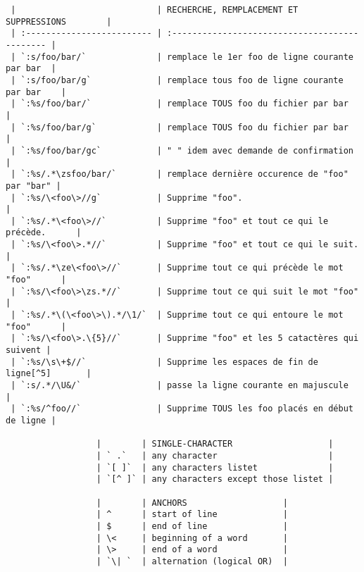 \documentclass[10pt,landscape]{article}
\begin{document}
\begin{multicols}{2}
\begin{verbatim}
 |                            | RECHERCHE, REMPLACEMENT ET SUPPRESSIONS        |
 | :------------------------- | :--------------------------------------------- |
 | `:s/foo/bar/`              | remplace le 1er foo de ligne courante par bar  |
 | `:s/foo/bar/g`             | remplace tous foo de ligne courante par bar    |
 | `:%s/foo/bar/`             | remplace TOUS foo du fichier par bar           |
 | `:%s/foo/bar/g`            | remplace TOUS foo du fichier par bar           |
 | `:%s/foo/bar/gc`           | " " idem avec demande de confirmation          |
 | `:%s/.*\zsfoo/bar/`        | remplace dernière occurence de "foo" par "bar" |
 | `:%s/\<foo\>//g`           | Supprime "foo".                                |
 | `:%s/.*\<foo\>//`          | Supprime "foo" et tout ce qui le précède.      |
 | `:%s/\<foo\>.*//`          | Supprime "foo" et tout ce qui le suit.         |
 | `:%s/.*\ze\<foo\>//`       | Supprime tout ce qui précède le mot "foo"      |
 | `:%s/\<foo\>\zs.*//`       | Supprime tout ce qui suit le mot "foo"         |
 | `:%s/.*\(\<foo\>\).*/\1/`  | Supprime tout ce qui entoure le mot "foo"      |
 | `:%s/\<foo\>.\{5}//`       | Supprime "foo" et les 5 catactères qui suivent |
 | `:%s/\s\+$//`              | Supprime les espaces de fin de ligne[^5]       |
 | `:s/.*/\U&/`               | passe la ligne courante en majuscule           |
 | `:%s/^foo//`               | Supprime TOUS les foo placés en début de ligne |

                  |        | SINGLE-CHARACTER                   |
                  | ` .`   | any character                      |
                  | `[ ]`  | any characters listet              |
                  | `[^ ]` | any characters except those listet |

                  |        | ANCHORS                   |
                  | ^      | start of line             |
                  | $      | end of line               |
                  | \<     | beginning of a word       |
                  | \>     | end of a word             |
                  | `\| `  | alternation (logical OR)  |


\end{verbatim}
\end{multicols}
\end{document}
